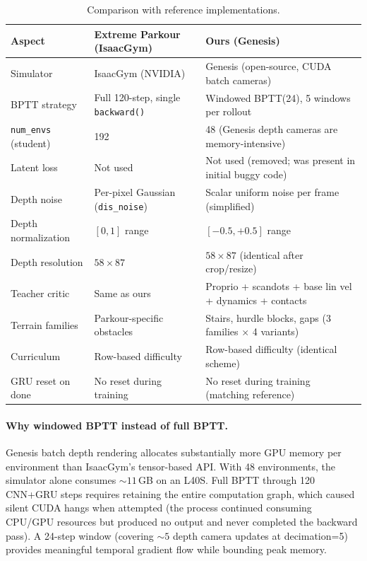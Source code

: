\documentclass[11pt,a4paper]{article}
\begin{document}
\begin{table}[ht]
\centering
\caption{Comparison with reference implementations.}
\label{tab:diffs}
\small
\begin{tabular}{p{3.2cm}p{4.2cm}p{4.2cm}}
\toprule
\textbf{Aspect} & \textbf{Extreme Parkour (IsaacGym)} & \textbf{Ours (Genesis)} \\
\midrule
Simulator & IsaacGym (NVIDIA) & Genesis (open-source, CUDA batch cameras) \\
BPTT strategy & Full 120-step, single \texttt{backward()} & Windowed BPTT(24), 5 windows per rollout \\
\texttt{num\_envs} (student) & 192 & 48 (Genesis depth cameras are memory-intensive) \\
Latent loss & Not used & Not used (removed; was present in initial buggy code) \\
Depth noise & Per-pixel Gaussian (\texttt{dis\_noise}) & Scalar uniform noise per frame (simplified) \\
Depth normalization & $[0, 1]$ range & $[-0.5, +0.5]$ range \\
Depth resolution & $58 \times 87$ & $58 \times 87$ (identical after crop/resize) \\
Teacher critic & Same as ours & Proprio + scandots + base lin vel + dynamics + contacts \\
Terrain families & Parkour-specific obstacles & Stairs, hurdle blocks, gaps (3 families $\times$ 4 variants) \\
Curriculum & Row-based difficulty & Row-based difficulty (identical scheme) \\
GRU reset on done & No reset during training & No reset during training (matching reference) \\
\bottomrule
\end{tabular}
\end{table}

\paragraph{Why windowed BPTT instead of full BPTT.}
Genesis batch depth rendering allocates substantially more GPU memory per
environment than IsaacGym's tensor-based API. With 48 environments, the
simulator alone consumes ${\sim}11$\,GB on an L40S. Full BPTT through 120
CNN+GRU steps requires retaining the entire computation graph, which caused
silent CUDA hangs when attempted (the process continued consuming CPU/GPU
resources but produced no output and never completed the backward pass). A
24-step window (covering ${\sim}5$ depth camera updates at decimation=5)
provides meaningful temporal gradient flow while bounding peak memory.
\end{document}

